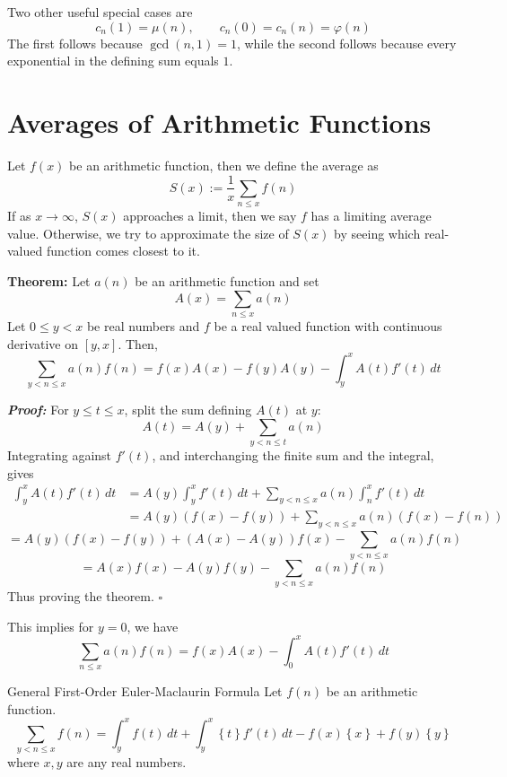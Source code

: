 \documentclass[a4paper,11pt,abstracton]{scrartcl}
\theoremstyle{dotlessP}
\theoremstyle{dotlessS}
\theoremstyle{remark}
\theoremstyle{definition}
\begin{document}
\begin{remark_box}
Two other useful special cases are
\[
    c_n(1)=\mu(n),
    \qquad
    c_n(0)=c_n(n)=\varphi(n)
\]
The first follows because $\gcd(n,1)=1$, while the second follows
because every exponential in the defining sum equals $1$.
\end{remark_box}

\section{Averages of Arithmetic Functions}

\begin{definition_box}
Let $f(x)$ be an arithmetic function, then we define the average as
$$S(x):= \frac{1}{x}\sum_{n \le x}f(n)$$
If as $x \rightarrow \infty$, $S(x)$ approaches a limit, then we say $f$ has a limiting average value. Otherwise, we try to approximate the size of $S(x)$ by seeing which real-valued function comes closest to it.
\end{definition_box}

\begin{problem_box}
\textbf{Theorem:}
Let $a(n)$ be an arithmetic function and set 
$$A(x)=\sum_{n \le x} a(n)$$
Let $0 \le y < x$ be real numbers and $f$ be a real valued function with continuous derivative on $[y,x]$. Then,
$$\sum_{y < n \le x} a(n)f(n) = f(x)A(x)-f(y)A(y)-\int_{y}^{x}A(t)f'(t)\,dt$$
\end{problem_box}

\begin{claim_box}
\textbf{\textit{Proof:}}
For $y\leq t\leq x$, split the sum defining $A(t)$ at $y$:
\[
    A(t)=A(y)+\sum_{y<n\leq t}a(n)
\]
Integrating against $f'(t)$, and interchanging the finite sum and the
integral, gives
\begin{align*}
    \int_y^x A(t)f'(t)\,dt
      &=A(y)\int_y^x f'(t)\,dt
        +\sum_{y<n\leq x}a(n)\int_n^x f'(t)\,dt\\
      &=A(y)(f(x)-f(y))
        +\sum_{y<n\leq x}a(n)(f(x)-f(n))
\end{align*}
$$=A(y)(f(x)-f(y))
        +(A(x)-A(y))f(x)-\sum_{y<n\leq x}a(n)f(n)$$
$$=A(x)f(x)-A(y)f(y)-\sum_{y<n\leq x}a(n)f(n)$$
Thus proving the theorem.
\hfill $\square$
\end{claim_box}

This implies for $y=0$, we have
$$\sum_{n \le x}a(n)f(n) = f(x)A(x)-\int_{0}^{x}A(t)f'(t)\,dt$$

\begin{mainbox}{General First-Order Euler-Maclaurin Formula}
Let $f(n)$ be an arithmetic function.
$$\sum_{y<n \le x}f(n)
      =\int_y^x f(t)\,dt
       +\int_y^x \left\{t\right\}f'(t)\,dt
       -f(x)\left\{x\right\}+f(y)\left\{y\right\}$$
where $x,y$ are any real numbers.
\end{mainbox}
\end{document}
